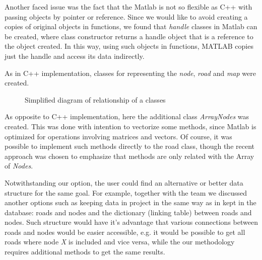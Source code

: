 \documentclass{article}
\begin{document}
Another faced issue was the fact that the Matlab is not so flexible as C++ with passing objects by pointer or reference. Since we would like to avoid creating a copies of original objects in functions, we found that \textit{handle} classes in Matlab can be created, where class constructor returns a handle object that is a reference to the object created. In this way, using such objects in functions, MATLAB copies just the handle and access its data indirectly.

As in C++ implementation, classes for representing the \textit{node}, \textit{road} and \textit{map} were created.

\begin{figure}[!h]
\centering
{}
\caption{Simplified diagram of relationship of a classes}
\end{figure}

As opposite to C++ implementation, here the additional class \textit{ArrayNodes} was created. This was done with intention to vectorize some methods, since Matlab is optimized for operations involving matrices and vectors. Of course, it was possible to implement such methods directly to the road class, though the recent approach was chosen to emphasize that methods are only related with the Array of \textit{Nodes}.

Notwithstanding our option, the user could find an alternative or better data structure for the same goal.
For example, together with the team we discussed another options such as keeping data in project in the same way as in kept in the database: roads and nodes and the dictionary (linking table) between roads and nodes. Such structure would have it's advantage that various connections between roads and nodes would be easier accessible, e.g. it would be possible to get all roads where node \textit{X} is included and vice versa, while the our methodology requires additional methods to get the same results. 
\end{document}
